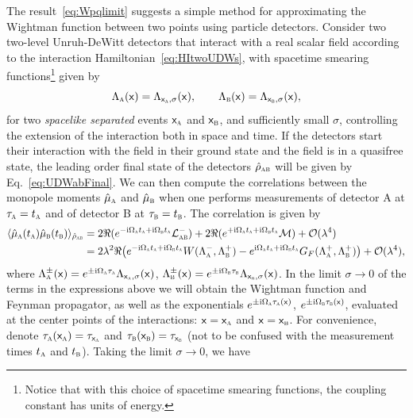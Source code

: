 \documentclass[letterpaper,12pt,titlepage,oneside,final]{book}
\newcommand{\mf}{\mathsf}%
\newcommand{\ii}{\mathrm{i}}
\renewcommand{\r}{\hat{\rho}}
\newcommand{\tc}[1]{\textsc{#1}}
\begin{document}
    The result~\eqref{eq:Wpqlimit} suggests a simple method for approximating the Wightman function between two points using particle detectors. Consider two two-level Unruh-DeWitt detectors that interact with a real scalar field according to the interaction Hamiltonian~\eqref{eq:HItwoUDWs}, with spacetime smearing functions\footnote{Notice that with this choice of spacetime smearing functions, the coupling constant has units of energy.} given by
    \begin{equation}
        \Lambda_\tc{a}(\mf x) = \Lambda_{\mf x_\tc{a},\sigma}(\mf x),\quad\quad 
        \Lambda_\tc{b}(\mf x) = \Lambda_{\mf x_\tc{b},\sigma}(\mf x),
    \end{equation}
    for two \textit{spacelike separated} events $\mf x_\tc{a}$ and $\mf x_\tc{b}$, and sufficiently small $\sigma$, controlling the extension of the interaction both in space and time. If the detectors start their interaction with the field in their ground state and the field is in a quasifree state, the leading order final state of the detectors $\hat{\rho}_\tc{ab}$ will be given by Eq.~\eqref{eq:UDWabFinal}. We can then compute the correlations between the monopole moments $\hat{\mu}_\tc{a}$ and $\hat{\mu}_\tc{b}$ when one performs measurements of detector A at $\tau_\tc{a} = t_\tc{a}$ and of detector B at $\tau_\tc{b} = t_\tc{b}$. The correlation is given by
    \begin{align}\label{eq:corrmuAmuB}
        \langle \hat{\mu}_\tc{a}(t_\tc{a}) \hat{\mu}_\tc{b}(t_\tc{b})\rangle_{\r_{\tc{ab}}} &=  2 \Re(e^{- \ii \Omega_\tc{a} t_\tc{a} + \ii \Omega_\tc{b} t_\tc{a}}\mathcal{L}_\tc{ab}^-) + 2 \Re(e^{+\ii \Omega_\tc{a} t_\tc{a} + \ii \Omega_\tc{b} t_\tc{a}}\mathcal{M}) +\mathcal{O}(\lambda^4)\\
        &= 2\lambda^2 \Re\big(e^{- \ii \Omega_\tc{a} t_\tc{a} + \ii \Omega_\tc{b} t_\tc{a}}W(\Lambda_\tc{a}^-,\Lambda_\tc{b}^+)-e^{\ii \Omega_\tc{a} t_\tc{a} + \ii \Omega_\tc{b} t_\tc{a}}G_F(\Lambda_\tc{a}^+,\Lambda_\tc{b}^+)\big) + \mathcal{O}(\lambda^4),\nonumber
    \end{align}
    where $\Lambda_\tc{a}^\pm(\mf x) = e^{\pm \ii \Omega_\tc{a}\tau_\tc{a}}\Lambda_{\mf x_\tc{a},\sigma}(\mf x)$, $\Lambda_\tc{b}^\pm(\mf x) = e^{\pm\ii \Omega_\tc{b}\tau_\tc{b}}\Lambda_{\mf x_\tc{b},\sigma}(\mf x)$. In the limit $\sigma\to 0$ of the terms in the expressions above we will obtain the Wightman function and Feynman propagator, as well as the exponentials $e^{\pm \ii \Omega_\tc{a}\tau_\tc{a}(\mf x)}$, $e^{\pm \ii \Omega_\tc{b}\tau_\tc{b}(\mf x)}$, evaluated at the center points of the interactions: $\mf x = \mf x_\tc{a}$ and $\mf x = \mf x_\tc{b}$. For convenience, denote $\tau_\tc{a}(\mf x_\tc{a}) = \tau_{\mf x_\tc{a}}$ and $\tau_\tc{b}(\mf x_\tc{b}) = \tau_{\mf x_\tc{b}}$ (not to be confused with the measurement times $t_\tc{a}$ and $t_\tc{b}$). Taking the limit $\sigma\to 0$, we have
\end{document}
